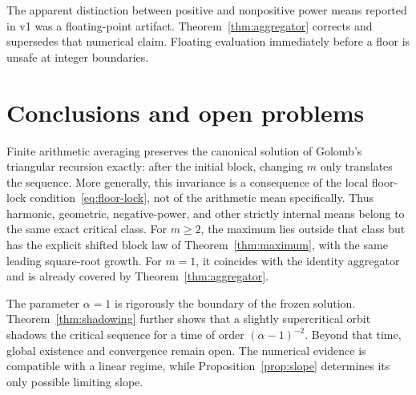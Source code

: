 \documentclass[11pt]{article}
\theoremstyle{definition}
\theoremstyle{remark}
\begin{document}
The apparent distinction between positive and nonpositive power means
reported in v1 was a floating-point artifact.
Theorem~\ref{thm:aggregator} corrects and supersedes that numerical claim.
Floating evaluation immediately before a floor is unsafe at integer
boundaries.

\section{Conclusions and open problems}\label{sec:conclusion}

Finite arithmetic averaging preserves the canonical solution of Golomb's
triangular recursion exactly: after the initial block, changing $m$ only
translates the sequence.  More generally, this invariance is a consequence
of the local floor-lock condition~\eqref{eq:floor-lock}, not of the arithmetic
mean specifically.  Thus harmonic, geometric, negative-power, and other
strictly internal means belong to the same exact critical class.  For
$m\ge2$, the maximum lies outside that class but has the explicit shifted
block law of Theorem~\ref{thm:maximum}, with the same leading square-root
growth.  For $m=1$, it coincides with the identity aggregator and is already
covered by Theorem~\ref{thm:aggregator}.

The parameter $\alpha=1$ is rigorously the boundary of the frozen solution.
Theorem~\ref{thm:shadowing} further shows that a slightly supercritical orbit
shadows the critical sequence for a time of order $(\alpha-1)^{-2}$.  Beyond
that time, global existence and convergence remain open.  The numerical
evidence is compatible with a linear regime, while
Proposition~\ref{prop:slope} determines its only possible limiting slope.
\end{document}
